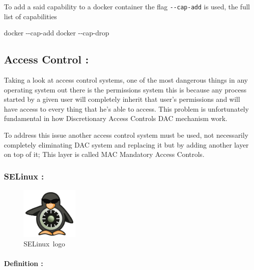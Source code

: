 \documentclass[
  14pt,
  english,
  a4paper,
]{scrreprt}
\newenvironment{Shaded}{}{}
\newcommand{\ExtensionTok}[1]{#1}
\newcommand{\NormalTok}[1]{#1}
\begin{document}
To add a said capability to a docker container the flag
\texttt{-\/-cap-add} is used, the full list of capabilities

\begin{Shaded}
\begin{Highlighting}[]
\ExtensionTok{docker}\NormalTok{ {-}{-}cap{-}add}
\ExtensionTok{docker}\NormalTok{ {-}{-}cap{-}drop}
\end{Highlighting}
\end{Shaded}

\hypertarget{access-control}{%
\subsection{Access Control :}\label{access-control}}

Taking a look at access control systems, one of the most dangerous
things in any operating system out there is the permissions system this
is because any process started by a given user will completely inherit
that user's permissions and will have access to every thing that he's
able to access. This problem is unfortunately fundamental in how
Discretionary Access Controls DAC mechanism work.

To address this issue another access control system must be used, not
necessarily completely eliminating DAC system and replacing it but by
adding another layer on top of it; This layer is called MAC Mandatory
Access Controls.

\hypertarget{selinux}{%
\subsubsection{SELinux :}\label{selinux}}

\begin{figure}
\hypertarget{fig:selogo}{%
\centering
\includegraphics[width=0.25\textwidth,height=\textheight]{figures/Selinux-logo.png}
\caption{SELinux~logo}\label{fig:selogo}
}
\end{figure}

\hypertarget{definition-5}{%
\paragraph{Definition :}\label{definition-5}}
\end{document}
